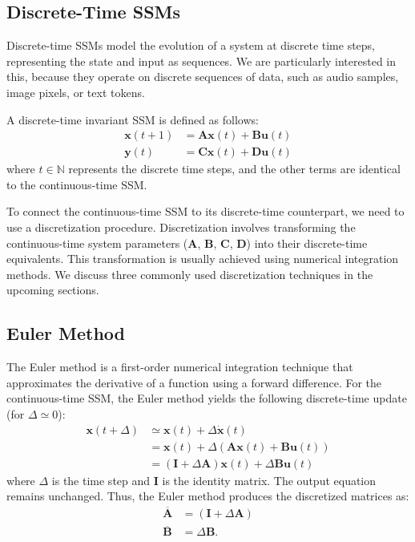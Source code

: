 \documentclass[12pt,a4paper]{report}
\begin{document}
\subsection{Discrete-Time SSMs}
Discrete-time SSMs model the evolution of a system at discrete time steps, representing the state and input as sequences. We are particularly interested in this, because they operate on discrete sequences of data, such as audio samples, image pixels, or text tokens.

\medskip

A discrete-time invariant SSM is defined as follows:
\[
\begin{aligned}
\mathbf{x}(t+1) &= \mathbf{A}\mathbf{x}(t) + \mathbf{B}\mathbf{u}(t) \\
\mathbf{y}(t) &= \mathbf{C}\mathbf{x}(t) + \mathbf{D}\mathbf{u}(t)
\end{aligned}
\]
where $t \in \mathbb{N}$ represents the discrete time steps, and the other terms are identical to the continuous-time SSM.

\medskip

To connect the continuous-time SSM to its discrete-time counterpart, we need to use a discretization procedure. Discretization involves transforming the continuous-time system parameters ($\mathbf{A}$, $\mathbf{B}$, $\mathbf{C}$, $\mathbf{D}$) into their discrete-time equivalents. This transformation is usually achieved using numerical integration methods. We discuss three commonly used discretization techniques in the upcoming sections.

\subsection{Euler Method}
The Euler method is a first-order numerical integration technique that approximates the derivative of a function using a forward difference. For the continuous-time SSM, the Euler method yields the following discrete-time update (for $\Delta \simeq 0$):
\[
\begin{aligned}
\mathbf{x}(t+\Delta) &\simeq \mathbf{x}(t) + \Delta \dot{\mathbf{x}}(t) \\
&= \mathbf{x}(t) + \Delta (\mathbf{A}\mathbf{x}(t) + \mathbf{B}\mathbf{u}(t)) \\
&= (\mathbf{I} + \Delta \mathbf{A})\mathbf{x}(t) + \Delta  \mathbf{B}\mathbf{u}(t)
\end{aligned}
\]
where $\Delta$ is the time step and $\mathbf{I}$ is the identity matrix. The output equation remains unchanged. Thus, the Euler method produces the discretized matrices as:
\[
\begin{aligned}
\mathbf{\overline{A}} &= (\mathbf{I} + \Delta\mathbf{A}) \\
\mathbf{\overline{B}} &= \Delta \mathbf{B}.
\end{aligned}
\]
\end{document}
